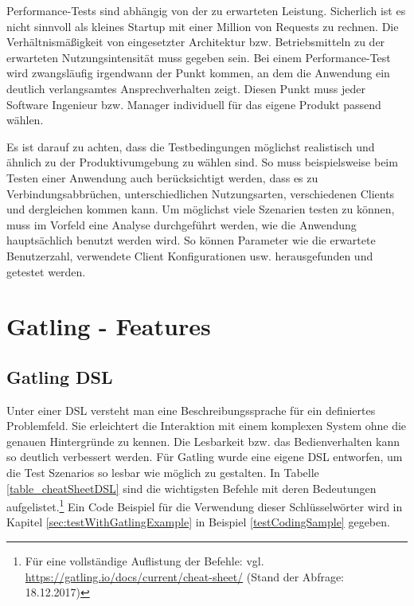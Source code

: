Performance-Tests sind abhängig von der zu erwarteten Leistung.
Sicherlich ist es nicht sinnvoll als \glqq kleines\grqq{} Startup mit einer Million von Requests zu rechnen.
Die Verhältnismäßigkeit von eingesetzter Architektur bzw. Betriebsmitteln zu der erwarteten Nutzungsintensität muss gegeben sein. 
Bei einem Performance-Test wird zwangsläufig irgendwann der Punkt kommen, an dem die Anwendung ein deutlich verlangsamtes Ansprechverhalten zeigt. 
Diesen Punkt muss jeder Software Ingenieur bzw. Manager individuell für das eigene Produkt passend wählen.

Es ist darauf zu achten, dass die Testbedingungen möglichst realistisch und ähnlich zu der Produktivumgebung zu wählen sind.
So muss beispielsweise beim Testen einer Anwendung auch berücksichtigt werden, dass es zu Verbindungsabbrüchen, unterschiedlichen Nutzungsarten, verschiedenen Clients und dergleichen kommen kann.
Um möglichst viele Szenarien testen zu können, muss im Vorfeld eine Analyse durchgeführt werden, wie die Anwendung hauptsächlich benutzt werden wird.
So können Parameter wie die erwartete Benutzerzahl, verwendete Client Konfigurationen usw. herausgefunden und getestet werden.

\section{Gatling - Features}


\subsection{Gatling DSL}

Unter einer \acf{DSL} versteht man eine Beschreibungssprache für ein definiertes Problemfeld. 
Sie erleichtert die Interaktion mit einem komplexen System ohne die genauen Hintergründe zu kennen.
Die Lesbarkeit bzw. das Bedienverhalten kann so deutlich verbessert werden. 
Für Gatling wurde eine eigene \ac{DSL} entworfen, um die Test Szenarios so lesbar wie möglich zu gestalten. 
In Tabelle \ref{table_cheatSheetDSL} sind die wichtigsten Befehle mit deren Bedeutungen aufgelistet.\footnote{{} Für eine vollständige Auflistung der Befehle: vgl. \url{https://gatling.io/docs/current/cheat-sheet/} (Stand der Abfrage: 18.12.2017)} 
Ein Code Beispiel für die Verwendung dieser Schlüsselwörter wird in Kapitel \ref{sec:testWithGatlingExample} in Beispiel \ref{testCodingSample} gegeben. 

